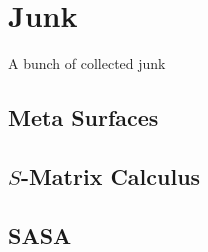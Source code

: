 \section{Junk} \label{sec:results}
A bunch of collected junk

\subsection{Meta Surfaces} \label{sec:MS}

\newpage

\subsection{$S$-Matrix Calculus}

\newpage

\subsection{SASA}

\newpage
